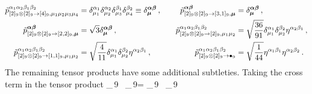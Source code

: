 \begin{align}
	\label{eq:tensorprods_2t2}
	\tilde{p}^{\alpha_1\alpha_2\beta_1 \beta_2}_{[2]_9 \otimes [2]_9 \to [4]_9,\mu_1 \mu_2\mu_3\mu_4} & = \delta^{\alpha_1}_{\mu_1} \delta^{\alpha_2}_{\mu_2}\delta^{\beta_1}_{\mu_3}\delta^{\beta_2}_{\mu_4} \equiv \delta^{\boldsymbol{\alpha} \boldsymbol{\beta}}_{\boldsymbol{\mu}}
	\,,                                                                                               &                                                                                                                                             &  &
	\tilde{p}^{\boldsymbol{\alpha}\boldsymbol{\beta}}_{[2]_9 \otimes [2]_9 \to [3,1]_9,\boldsymbol{\mu}}                                  & = \delta^{\boldsymbol{\alpha} \boldsymbol{\beta}}_{\boldsymbol{\mu}}\,,                                                                                                                                                                                                                                                                            \\
	\tilde{p}^{\boldsymbol{\alpha}\boldsymbol{\beta}}_{[2]_9 \otimes [2]_9 \to [2,2]_9,\boldsymbol{\mu}}                                  & = \sqrt{3} \delta^{\boldsymbol{\alpha} \boldsymbol{\beta}}_{\boldsymbol{\mu}}\,,                                                                                                &  &   &
	\tilde{p}^{\alpha_1\alpha_2\beta_1 \beta_2}_{[2]_9 \otimes [2]_9 \to [2]_9,\mu_1 \mu_2}           & = \sqrt{\frac{36}{91}} \delta^{\alpha_1}_{\mu_1} \delta^{\beta_2}_{\mu_2} \eta^{\alpha_2 \beta_1}\,,
	\nonumber                                                                                                                                                                                                                                                                                                                                                                                                          \\
	\tilde{p}^{\alpha_1\alpha_2\beta_1 \beta_2}_{[2]_9 \otimes [2]_9 \to [1,1]_9,\mu_1 \mu_2}         & = \sqrt{\frac{4}{11}} \delta^{\alpha_1}_{\mu_1} \delta^{\beta_2}_{\mu_2} \eta^{\alpha_2 \beta_1}\,,                                         &  &   & \tilde{p}^{\alpha_1\alpha_2\beta_1 \beta_2}_{[2]_9 \otimes [2]_9 \to \bullet_9} & = \sqrt{\frac{1}{44}} \eta^{\alpha_1\beta_1} \eta^{\alpha_2 \beta_2}\,.
	\nonumber
\end{align}
The remaining tensor products have some additional subtleties. Taking the cross term in the tensor product
\beq
{}_{\,9} \otimes \, _{\,9}=
_{\,9}
\oplus \,      _{\,9}
